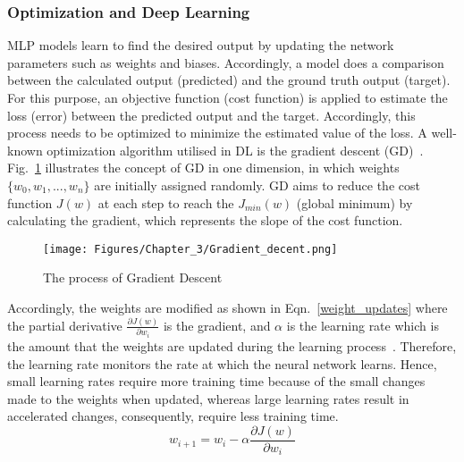 \subsubsection{Optimization and Deep Learning}
MLP models learn to find the desired output by updating the network parameters such as weights and biases.
Accordingly, a model does a comparison between the calculated output (predicted) and the ground truth output (target).
For this purpose, an objective function (cost function) is applied to estimate the loss (error) between the predicted output and the target.
Accordingly, this process needs to be optimized to minimize the estimated value of the loss.
A well-known optimization algorithm utilised in DL is the gradient descent (GD)~\cite{Lecun2015}.
Fig.~\ref{fig:GD} illustrates the concept of GD in one dimension, in which weights \(\{w_0,w_1,...,w_n\}\) are initially assigned randomly.
GD aims to reduce the cost function \(J(w)\) at each step to reach the \(J_{min}(w)\) (global minimum) by calculating the gradient, which represents the slope of the cost function.
\begin{figure}[!ht]
	\begin{center}
		\centering
		\texttt{[image: Figures/Chapter\_3/Gradient\_decent.png]}
	\end{center}
	\caption{The process of Gradient Descent} 
	\label{fig:GD}
\end{figure}
Accordingly, the weights are modified as shown in Eqn.~\ref{weight_updates} where the partial derivative \(\frac{\partial J(w)}{\partial w_i}\) is the gradient, and \(\alpha \) is the learning rate which is the amount that the weights are updated during the learning process~\cite{Russell2010}.
Therefore, the learning rate monitors the rate at which the neural network learns.
Hence, small learning rates require more training time because of the small changes made to the weights when updated, whereas large learning rates result in accelerated changes, consequently, require less training time.
\begin{equation}
	w_{i+1}= w_{i} -\alpha \frac{\partial J(w)}{\partial w_i} 
	\label{weight_updates}
\end{equation}

